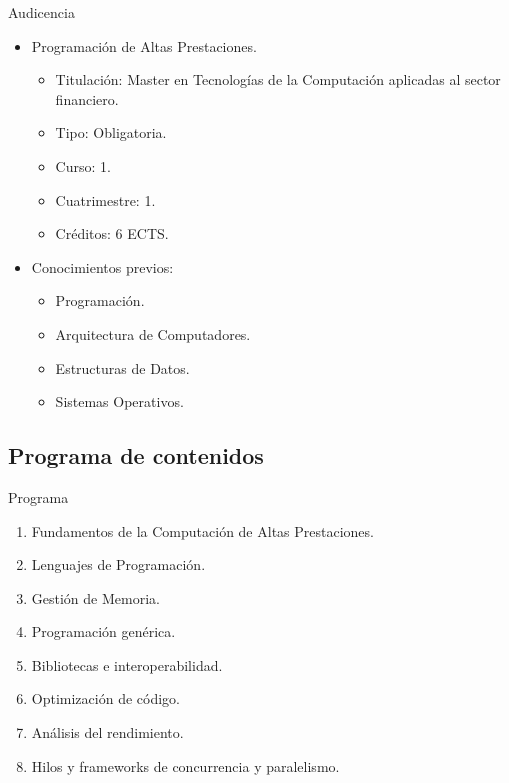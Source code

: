 \begin{frame}{Audicencia}
\begin{itemize}
  \item Programación de Altas Prestaciones.
    \begin{itemize}
      \item Titulación: Master en Tecnologías de la Computación aplicadas al sector financiero.
      \item Tipo: Obligatoria.
      \item Curso: 1.
      \item Cuatrimestre: 1.
      \item Créditos: 6 ECTS.
    \end{itemize}

  \vfill
  \item Conocimientos previos:
    \begin{itemize}
      \item Programación.
      \item Arquitectura de Computadores.
      \item Estructuras de Datos.
      \item Sistemas Operativos.
    \end{itemize}
\end{itemize}
\end{frame}

\subsection{Programa de contenidos}

\begin{frame}[t]{Programa}
\begin{enumerate}
  \item Fundamentos de la Computación de Altas Prestaciones.
  \item Lenguajes de Programación.
  \item Gestión de Memoria.
  \item Programación genérica.
  \item Bibliotecas e interoperabilidad.
  \item Optimización de código.
  \item Análisis del rendimiento.
  \item Hilos y frameworks de concurrencia y paralelismo.
\end{enumerate}
\end{frame}
